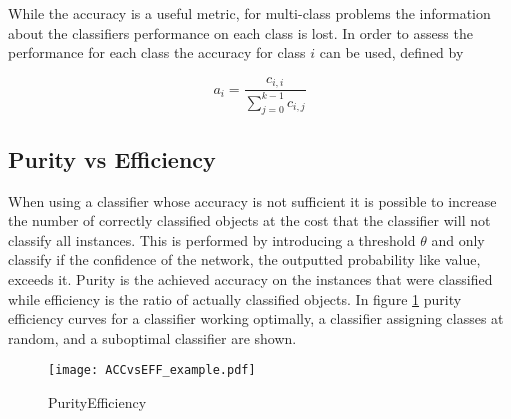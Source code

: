 While the accuracy is a useful metric, for multi-class problems the information about the classifiers performance on each class is lost. In order to assess the performance for each class the accuracy for class $i$ can be used, defined by

\begin{equation}
a_i = \frac{c_{i,i}}{\sum_{j=0}^{k-1} c_{i,j}}
\end{equation}



\subsection{Purity vs Efficiency}

When using a classifier whose accuracy is not sufficient it is possible to increase the number of correctly classified objects at the cost that the classifier will not classify all instances. This is performed by introducing a threshold $\theta$ and only classify if the confidence of the network, the outputted probability like value, exceeds it. Purity is the achieved accuracy on the instances that were classified while efficiency is the ratio of actually classified objects. In figure \ref{fig:PURvsEFF} purity efficiency curves for a classifier working optimally, a classifier assigning classes at random, and a suboptimal classifier are shown. 

\begin{figure}[H]
\begin{center}
\texttt{[image: ACCvsEFF\_example.pdf]}

\end{center}
\caption{PurityEfficiency}
\label{fig:PURvsEFF}
\end{figure}

%




